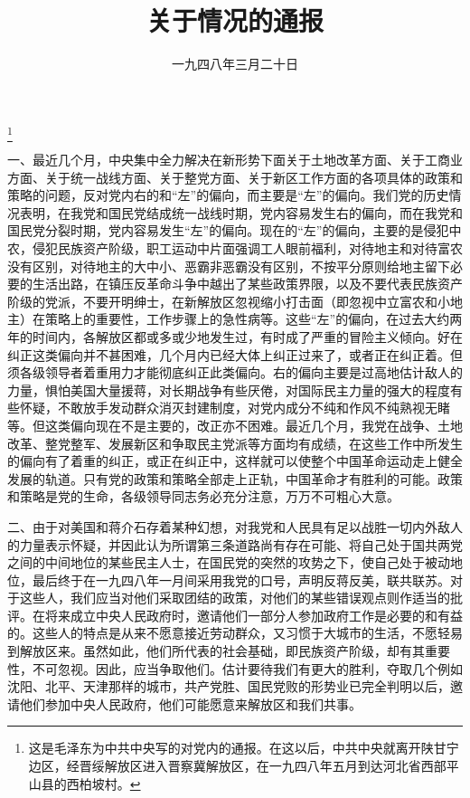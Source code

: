
\title{关于情况的通报}
\date{一九四八年三月二十日}
\thanks{这是毛泽东为中共中央写的对党内的通报。在这以后，中共中央就离开陕甘宁边区，经晋绥解放区进入晋察冀解放区，在一九四八年五月到达河北省西部平山县的西柏坡村。}
\maketitle


一、最近几个月，中央集中全力解决在新形势下面关于土地改革方面、关于工商业方面、关于统一战线方面、关于整党方面、关于新区工作方面的各项具体的政策和策略的问题，反对党内右的和“左”的偏向，而主要是“左”的偏向。我们党的历史情况表明，在我党和国民党结成统一战线时期，党内容易发生右的偏向，而在我党和国民党分裂时期，党内容易发生“左”的偏向。现在的“左”的偏向，主要的是侵犯中农，侵犯民族资产阶级，职工运动中片面强调工人眼前福利，对待地主和对待富农没有区别，对待地主的大中小、恶霸非恶霸没有区别，不按平分原则给地主留下必要的生活出路，在镇压反革命斗争中越出了某些政策界限，以及不要代表民族资产阶级的党派，不要开明绅士，在新解放区忽视缩小打击面（即忽视中立富农和小地主）在策略上的重要性，工作步骤上的急性病等。这些“左”的偏向，在过去大约两年的时间内，各解放区都或多或少地发生过，有时成了严重的冒险主义倾向。好在纠正这类偏向并不甚困难，几个月内已经大体上纠正过来了，或者正在纠正着。但须各级领导者着重用力才能彻底纠正此类偏向。右的偏向主要是过高地估计敌人的力量，惧怕美国大量援蒋，对长期战争有些厌倦，对国际民主力量的强大的程度有些怀疑，不敢放手发动群众消灭封建制度，对党内成分不纯和作风不纯熟视无睹等。但这类偏向现在不是主要的，改正亦不困难。最近几个月，我党在战争、土地改革、整党整军、发展新区和争取民主党派等方面均有成绩，在这些工作中所发生的偏向有了着重的纠正，或正在纠正中，这样就可以使整个中国革命运动走上健全发展的轨道。只有党的政策和策略全部走上正轨，中国革命才有胜利的可能。政策和策略是党的生命，各级领导同志务必充分注意，万万不可粗心大意。

二、由于对美国和蒋介石存着某种幻想，对我党和人民具有足以战胜一切内外敌人的力量表示怀疑，并因此认为所谓第三条道路尚有存在可能、将自己处于国共两党之间的中间地位的某些民主人士，在国民党的突然的攻势之下，使自己处于被动地位，最后终于在一九四八年一月间采用我党的口号，声明反蒋反美，联共联苏。对于这些人，我们应当对他们采取团结的政策，对他们的某些错误观点则作适当的批评。在将来成立中央人民政府时，邀请他们一部分人参加政府工作是必要的和有益的。这些人的特点是从来不愿意接近劳动群众，又习惯于大城市的生活，不愿轻易到解放区来。虽然如此，他们所代表的社会基础，即民族资产阶级，却有其重要性，不可忽视。因此，应当争取他们。估计要待我们有更大的胜利，夺取几个例如沈阳、北平、天津那样的城市，共产党胜、国民党败的形势业已完全判明以后，邀请他们参加中央人民政府，他们可能愿意来解放区和我们共事。

